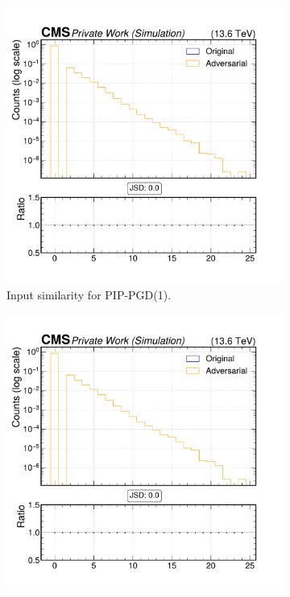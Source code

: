 \begin{figure}[h]
  \centering
  \begin{subfigure}[t]{0.32\textwidth}
    \includegraphics[width=\linewidth]{media/output/features/compare/combined_it_1/cmp_vtx_arr_sv_ntracks.pdf}
    \caption*{Input similarity for PIP-PGD(1).}
  \end{subfigure}\hfill
  \begin{subfigure}[t]{0.32\textwidth}
    \includegraphics[width=\linewidth]{media/output/features/compare/combined_it_2/cmp_vtx_arr_sv_ntracks.pdf}

\end{subfigure}
\end{figure}
